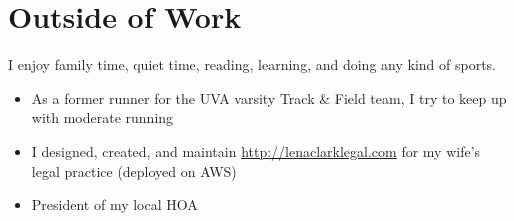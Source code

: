 \documentclass[12pt]{article}
\begin{document}

\section*{Outside of Work}

I enjoy family time, quiet time, reading, learning, and doing any kind of
sports.

\begin{itemize}
\item As a former runner for the UVA varsity Track \& Field team, I try to
  keep up with moderate running
\item I designed, created, and maintain \url{http://lenaclarklegal.com} for my
  wife's legal practice (deployed on AWS)
\item President of my local HOA
\end{itemize}
\end{document}
